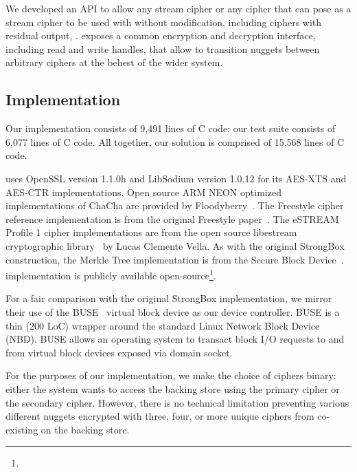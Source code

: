 


We developed an API to allow any stream cipher or any cipher that can pose as a
stream cipher to be used with \SYSTEM{} without modification, including ciphers
with residual output, . \SYSTEM{} exposes a common encryption and
decryption interface, including read and write handles, that allow \SYSTEM{} to
transition nuggets between arbitrary ciphers at the behest of the wider system.

\subsection{Implementation}

Our \SYSTEM{} implementation consists of 9,491 lines of C code; our test suite
consists of 6,077 lines of C code. All together, our solution is comprised of
15,568 lines of C code.

\SYSTEM{} uses OpenSSL version 1.1.0h and LibSodium version 1.0.12 for its
AES-XTS and AES-CTR implementations. Open source ARM NEON optimized
implementations of ChaCha are provided by Floodyberry~\cite{Floodyberry}. The
Freestyle cipher reference implementation is from the original Freestyle
paper~\cite{Freestyle}. The eSTREAM Profile 1 cipher implementations are from
the open source libestream cryptographic library~\cite{libestream} by Lucas
Clemente Vella. As with the original StrongBox construction, the Merkle Tree
implementation is from the Secure Block Device~\cite{SBD}. \SYSTEM{}
implementation is publicly available open-source\footnote{\SystemURI}.

For a fair comparison with the original StrongBox implementation, we mirror
their use of the BUSE~\cite{BUSE} virtual block device as our device controller.
BUSE is a thin (200 LoC) wrapper around the standard Linux Network Block Device
(NBD). BUSE allows an operating system to transact block I/O requests to and
from virtual block devices exposed via domain socket.

For the purposes of our implementation, we make the choice of ciphers binary:
either the system wants \SYSTEM{} to access the backing store using the primary
cipher or the secondary cipher. However, there is no technical limitation
preventing various different nuggets encrypted with three, four, or more unique
ciphers from co-existing on the backing store.

